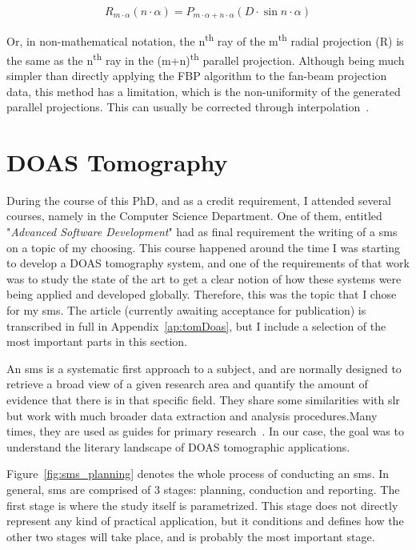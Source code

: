 \begin{equation}
    \label{eq:parallel_vs_fanbeam2}
    R_{m \cdot \alpha}(n \cdot\alpha) = P_{m \cdot\alpha + n
    \cdot\alpha}(D \cdot \sin n \cdot\alpha)
\end{equation}

Or, in non-mathematical notation, the n\textsuperscript{th} ray of the
m\textsuperscript{th} radial projection (R) is the same as the
n\textsuperscript{th} ray in the (m+n)\textsuperscript{th} parallel
projection. Although being much simpler than directly applying the
\gls{FBP} algorithm to the fan-beam projection data, this method has a
limitation, which is the non-uniformity of the generated parallel
projections. This can usually be corrected through
interpolation~\cite{Kak2001a}. 



\section{DOAS Tomography}%
\label{sec:doas_tomography}

During the course of this PhD, and as a credit requirement, I attended
several courses, namely in the Computer Science Department. One of them,
entitled "\emph{Advanced Software Development}" had as final requirement
the writing of a \gls{sms} on a topic of my choosing. This course
happened around the time I was starting to develop a \gls{DOAS}
tomography system, and one of the requirements of that work was to study
the state of the art to get a clear notion of how these systems were
being applied and developed globally. Therefore, this was the topic that
I chose for my \gls{sms}. The article (currently awaiting acceptance for
publication) is transcribed in full in Appendix~\ref{ap:tomDoas},  but I
include a selection of the most important parts in this section.

An \gls{sms} is a systematic first approach to a subject, and are
normally designed to retrieve a broad view of a given research area and
quantify the amount of evidence that there is in that specific field.
They share some similarities with \gls{slr} but work with much broader
data extraction and analysis procedures.Many times, they are used as
guides for primary research~\cite{Kitchenham2007}. In our case, the goal
was to understand the literary landscape of \gls{DOAS} tomographic
applications.

Figure~\ref{fig:sms_planning} denotes the whole process of conducting
an \gls{sms}. In general, \acrlong{sms} are comprised of 3 stages:
planning, conduction and reporting. The first stage is where the study
itself is parametrized. This stage does not directly represent any kind
of practical application, but it conditions and defines how the other
two stages will take place, and is probably the most important stage.

